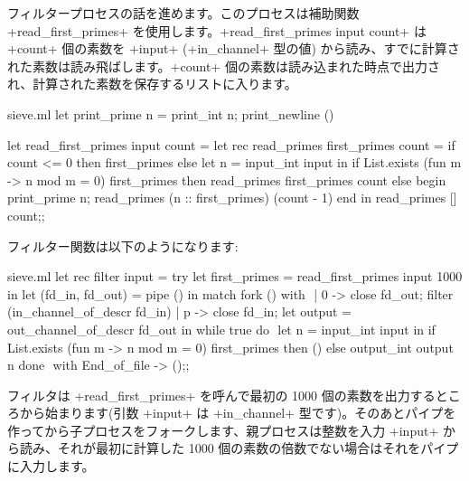 フィルタープロセスの話を進めます。このプロセスは補助関数 \ml+read_first_primes+ を使用します。\ml+read_first_primes input count+ は \ml+count+ 個の素数を \ml+input+ (\ml+in_channel+ 型の値) から読み、すでに計算された素数は読み飛ばします。\ml+count+ 個の素数は読み込まれた時点で出力され、計算された素数を保存するリストに入ります。
%
\begin{listingcodefile}[style=numbers]{sieve.ml}
let print_prime n = print_int n; print_newline ()

let read_first_primes input count =
  let rec read_primes first_primes count =
    if count <= 0 then first_primes else
    let n = input_int input in
    if List.exists (fun m -> n mod m = 0) first_primes then
      read_primes first_primes count
    else begin
      print_prime n;
      read_primes (n :: first_primes) (count - 1)
    end
  in
  read_primes [] count$\label{prog:pprime}$;;
\end{listingcodefile}
%
フィルター関数は以下のようになります:
%
\begin{listingcodefile}[style=numbers]{sieve.ml}
let rec filter input =
  try
    let first_primes = read_first_primes input 1000 in
    let (fd_in, fd_out) = pipe () in
    match fork () with $\label{prog:sievefilterfork}$
    | 0 ->
        close fd_out;
        filter (in_channel_of_descr fd_in)
    | p ->
        close fd_in;
        let output = out_channel_of_descr fd_out in
        while true do $\label{prog:sievefilterwhile}$
          let n = input_int input in
          if List.exists (fun m -> n mod m = 0) first_primes then ()
          else output_int output n
        done $\label{prog:sievefilterdone}$
  with End_of_file -> ();;
\end{listingcodefile}
%
フィルタは \ml+read_first_primes+ を呼んで最初の 1000 個の素数を出力するところから始まります(引数 \ml+input+ は \ml+in_channel+ 型です)。そのあとパイプを作ってから子プロセスをフォークします、親プロセスは整数を入力 \ml+input+ から読み、それが最初に計算した 1000 個の素数の倍数でない場合はそれをパイプに入力します。

